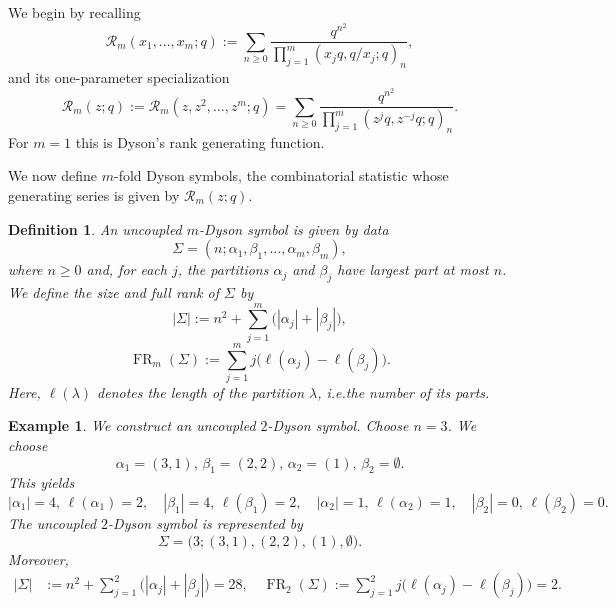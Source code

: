 \documentclass[12pt]{amsart}
\numberwithin{equation}{section}
\newtheorem{definition}[theorem]{Definition}
\newtheorem{example}{Example}
\begin{document}
We begin by recalling
\[
\mathcal{R}_m(x_1,\dots,x_m;q):=\sum_{n\ge 0}\frac{q^{n^2}}{\prod_{j=1}^m (x_jq,q/x_j;q)_n},
\]
and its one-parameter specialization
\[
\mathcal{R}_m(z;q):=\mathcal{R}_m(z,z^2,\dots,z^m;q)=\sum_{n\ge 0}\frac{q^{n^2}}{\prod_{j=1}^m (z^jq,z^{-j}q;q)_n}.
\]
For $m=1$ this is Dyson's rank generating function.

We now define $m$-fold Dyson symbols, the combinatorial statistic whose generating series is given by $\mathcal{R}_m(z;q)$. 

\begin{definition}
An \emph{uncoupled $m$-Dyson symbol} is given by data
\[
\Sigma=(n;\alpha_1,\beta_1,\dots,\alpha_m,\beta_m),
\]
where $n\ge 0$ and, for each $j$, the partitions $\alpha_j$ and $\beta_j$ have largest part at most $n$. We define the \emph{size} and \emph{full rank of $\Sigma$} by
\[
|\Sigma|:=n^2+\sum_{j=1}^m\bigl(|\alpha_j|+|\beta_j|\bigr),
\]
\[
\operatorname{FR}_m(\Sigma):=\sum_{j=1}^m j\bigl(\ell(\alpha_j)-\ell(\beta_j)\bigr).
\]
Here, $\ell(\lambda)$ denotes the length of the partition $\lambda$, i.e.\@ the number of its parts. 
\end{definition}

\begin{example}
We construct an \emph{uncoupled $2$-Dyson symbol}.
Choose $n=3$. We choose
\[
\alpha_1 =(3,1),\, \beta_1=(2,2),\, \alpha_2=(1),\,\beta_2=\emptyset.
\]
This yields
\[
|\alpha_1| = 4, \, \ell(\alpha_1) = 2, \quad |\beta_1| = 4, \, \ell(\beta_1) = 2, \quad |\alpha_2| = 1, \, \ell(\alpha_2) = 1, \quad |\beta_2| = 0, \, \ell(\beta_2) = 0.
\]
The uncoupled $2$-Dyson symbol is represented by 
\[
\Sigma = \bigl(3; (3,1), (2,2), (1), \emptyset\bigr).
\]
Moreover, 
\begin{align*}
|\Sigma| &:= n^2 + \sum_{j=1}^2 \bigl(|\alpha_j| + |\beta_j|\bigr) =28, \quad \operatorname{FR}_2(\Sigma) := \sum_{j=1}^2 j\bigl(\ell(\alpha_j) - \ell(\beta_j)\bigr) =2.
\end{align*}
\end{example}
\end{document}
